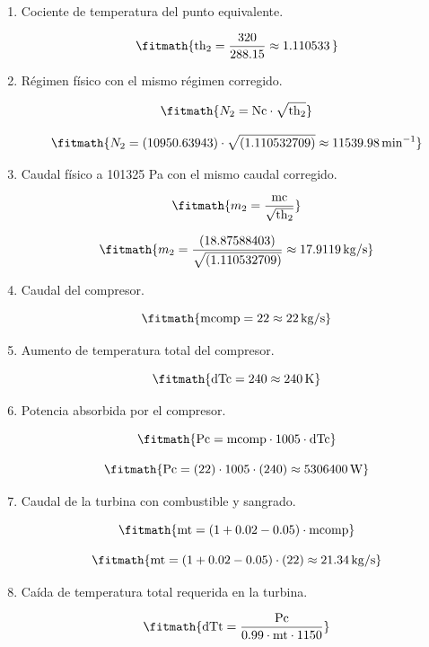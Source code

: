 \begin{enumerate}
\[\fitmath{\mathrm{mc}=\frac{m\cdot \sqrt{\mathrm{th}}}{\mathrm{de}}}\]

\[\fitmath{\mathrm{mc}=\frac{(14)\cdot \sqrt{(0.8676036786)}}{(0.6908462867)}\approx 18.87588\,\mathrm{kg/s}}\]

\item Cociente de temperatura del punto equivalente.

\[\fitmath{\mathrm{th}_{2}=\frac{320}{288.15}\approx 1.110533\,}\]

\item Régimen físico con el mismo régimen corregido.

\[\fitmath{N_{2}=\mathrm{Nc}\cdot \sqrt{\mathrm{th}_{2}}}\]

\[\fitmath{N_{2}=(10950.63943)\cdot \sqrt{(1.110532709)}\approx 11539.98\,\mathrm{min^{-1}}}\]

\item Caudal físico a 101325 Pa con el mismo caudal corregido.

\[\fitmath{m_{2}=\frac{\mathrm{mc}}{\sqrt{\mathrm{th}_{2}}}}\]

\[\fitmath{m_{2}=\frac{(18.87588403)}{\sqrt{(1.110532709)}}\approx 17.9119\,\mathrm{kg/s}}\]

\item Caudal del compresor.

\[\fitmath{\mathrm{mcomp}=22\approx 22\,\mathrm{kg/s}}\]

\item Aumento de temperatura total del compresor.

\[\fitmath{\mathrm{dTc}=240\approx 240\,\mathrm{K}}\]

\item Potencia absorbida por el compresor.

\[\fitmath{\mathrm{Pc}=\mathrm{mcomp}\cdot 1005\cdot \mathrm{dTc}}\]

\[\fitmath{\mathrm{Pc}=(22)\cdot 1005\cdot (240)\approx 5306400\,\mathrm{W}}\]

\item Caudal de la turbina con combustible y sangrado.

\[\fitmath{\mathrm{mt}=\left(1+0.02-0.05\right)\cdot \mathrm{mcomp}}\]

\[\fitmath{\mathrm{mt}=\left(1+0.02-0.05\right)\cdot (22)\approx 21.34\,\mathrm{kg/s}}\]

\item Caída de temperatura total requerida en la turbina.

\[\fitmath{\mathrm{dTt}=\frac{\mathrm{Pc}}{0.99\cdot \mathrm{mt}\cdot 1150}}\]


\end{enumerate}
